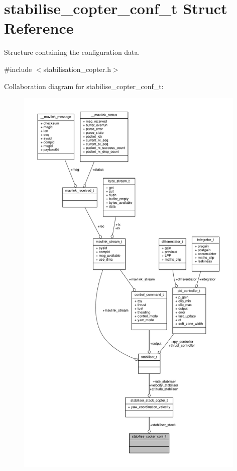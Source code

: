 \hypertarget{structstabilise__copter__conf__t}{\section{stabilise\+\_\+copter\+\_\+conf\+\_\+t Struct Reference}
\label{structstabilise__copter__conf__t}
}


Structure containing the configuration data.  




{\ttfamily \#include $<$stabilisation\+\_\+copter.\+h$>$}



Collaboration diagram for stabilise\+\_\+copter\+\_\+conf\+\_\+t\+:
\nopagebreak
\begin{figure}[H]
\begin{center}
\leavevmode
\includegraphics[height=550pt]{structstabilise__copter__conf__t__coll__graph}
\end{center}
\end{figure}
